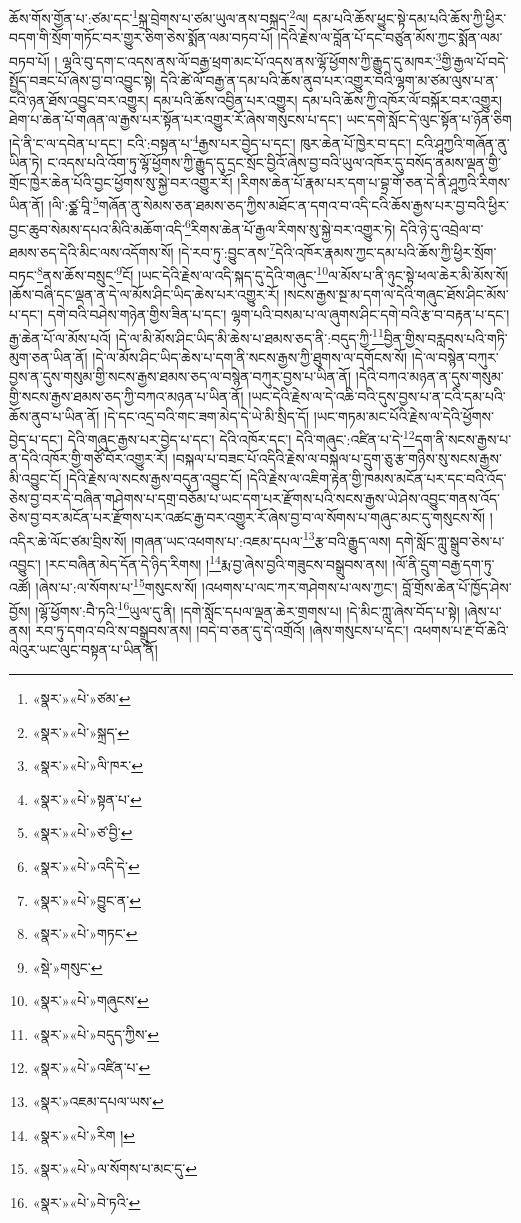 ཆོས་གོས་གྱོན་པ་:ཙམ་དང་\footnote{«སྣར་»«པེ་»ཙམ་}སྐྲ་བྲེགས་པ་ཙམ་ཡུལ་ནས་བསྐྲད་\footnote{«སྣར་»«པེ་»སྐྲད་}ལ། དམ་པའི་ཆོས་ཕྱུང་སྟེ་དམ་པའི་ཆོས་ཀྱི་ཕྱིར་བདག་གི་སྲོག་གཏོང་བར་གྱུར་ཅིག་ཅེས་སྨོན་ལམ་བཏབ་པོ། །དེའི་རྗེས་ལ་བློན་པོ་དང་བཙུན་མོས་ཀྱང་སྨོན་ལམ་བཏབ་པོ། །
ལྷའི་བུ་དག་ང་འདས་ནས་ལོ་བརྒྱ་ཕྲག་མང་པོ་འདས་ནས་ལྷོ་ཕྱོགས་ཀྱི་རྒྱུད་དུ་མཁར་\footnote{«སྣར་»«པེ་»ལི་ཁར་}གྱི་རྒྱལ་པོ་བདེ་སྤྱོད་བཟང་པོ་ཞེས་བྱ་བ་འབྱུང་སྟེ། དེའི་ཚེ་ལོ་བརྒྱ་ན་དམ་པའི་ཆོས་ནུབ་པར་འགྱུར་བའི་ལྷག་མ་ཙམ་ལུས་པ་ན་ངའི་ཉན་ཐོས་འབྱུང་བར་འགྱུར། དམ་པའི་ཆོས་འབྱིན་པར་འགྱུར། དམ་པའི་ཆོས་ཀྱི་འཁོར་ལོ་བསྐོར་བར་འགྱུར། ཐེག་པ་ཆེན་པོ་གཞན་ལ་རྒྱས་པར་སྟོན་པར་འགྱུར་རོ་ཞེས་གསུངས་པ་དང་། ཡང་དགེ་སློང་དེ་ལུང་སྟོན་པ་ཉོན་ཅིག །དེ་ནི་ང་ལ་དབེན་པ་དང་། ངའི་:བསྟན་པ་\footnote{«སྣར་»«པེ་»སྟན་པ་}རྒྱས་པར་བྱེད་པ་དང་། ཁུར་ཆེན་པོ་ཁྱེར་བ་དང་། ངའི་ཤཱཀྱའི་གཞོན་ནུ་ཡིན་ཏེ། ང་འདས་པའི་འོག་ཏུ་ལྷོ་ཕྱོགས་ཀྱི་རྒྱུད་དུ་དྲང་སྲོང་བྱིའོ་ཞེས་བྱ་བའི་ཡུལ་འཁོར་དུ་བསོད་ནམས་ལྡན་གྱི་གྲོང་ཁྱེར་ཆེན་པོའི་བྱང་ཕྱོགས་སུ་སྐྱེ་བར་འགྱུར་རོ། །རིགས་ཆེན་པོ་རྣམ་པར་དག་པ་བྷྲ་གོ་ཅན་དེ་ནི་ཤཱཀྱའི་རིགས་ཡིན་ནོ། །ལི་:ཙྪ་བཱི་\footnote{«སྣར་»«པེ་»ཙ་བྱི་}གཞོན་ནུ་སེམས་ཅན་ཐམས་ཅད་ཀྱིས་མཐོང་ན་དགའ་བ་འདི་ངའི་ཆོས་རྒྱས་པར་བྱ་བའི་ཕྱིར་བྱང་ཆུབ་སེམས་དཔའ་མིའི་མཆོག་འདི་\footnote{«སྣར་»«པེ་»འདི་དེ་}རིགས་ཆེན་པོ་རྒྱལ་རིགས་སུ་སྐྱེ་བར་འགྱུར་ཏེ། དེའི་ཉེ་དུ་འབྲེལ་བ་ཐམས་ཅད་དེའི་མིང་ལས་འདོགས་སོ། །དེ་རབ་ཏུ་:བྱུང་ནས་\footnote{«སྣར་»«པེ་»བྱུང་ན་}དེའི་འཁོར་རྣམས་ཀྱང་དམ་པའི་ཆོས་ཀྱི་ཕྱིར་སྲོག་བཏང་\footnote{«སྣར་»«པེ་»གཏང་}ནས་ཆོས་བསྲུང་\footnote{«སྡེ་»གསུང་}ངོ། །ཡང་དེའི་རྗེས་ལ་འདི་སྐད་དུ་དེའི་གཞུང་\footnote{«སྣར་»«པེ་»གཞུངས་}ལ་མོས་པ་ནི་ཉུང་སྟེ་ཕལ་ཆེར་མི་མོས་སོ། །ཆོས་བཞི་དང་ལྡན་ན་དེ་ལ་མོས་ཤིང་ཡིད་ཆེས་པར་འགྱུར་རོ། །སངས་རྒྱས་སྔ་མ་དག་ལ་དེའི་གཞུང་ཐོས་ཤིང་མོས་པ་དང་། དགེ་བའི་བཤེས་གཉེན་གྱིས་ཟིན་པ་དང་། ལྷག་པའི་བསམ་པ་ལ་ཞུགས་ཤིང་དགེ་བའི་རྩ་བ་བརྟན་པ་དང་། རྒྱ་ཆེན་པོ་ལ་མོས་པའོ། །དེ་ལ་མི་མོས་ཤིང་ཡིད་མི་ཆེས་པ་ཐམས་ཅད་ནི་:བདུད་ཀྱི་\footnote{«སྣར་»«པེ་»བདུད་ཀྱིས་}བྱིན་གྱིས་བརླབས་པའི་གཏི་མུག་ཅན་ཡིན་ནོ། །དེ་ལ་མོས་ཤིང་ཡིད་ཆེས་པ་དག་ནི་སངས་རྒྱས་ཀྱི་ཐུགས་ལ་དགོངས་སོ། །དེ་ལ་བསྙེན་བཀུར་བྱས་ན་དུས་གསུམ་གྱི་སངས་རྒྱས་ཐམས་ཅད་ལ་བསྙེན་བཀུར་བྱས་པ་ཡིན་ནོ། །དེའི་བཀའ་མཉན་ན་དུས་གསུམ་གྱི་སངས་རྒྱས་ཐམས་ཅད་ཀྱི་བཀའ་མཉན་པ་ཡིན་ནོ། །ཡང་དེའི་རྗེས་ལ་དེ་འཆི་བའི་དུས་བྱས་པ་ན་ངའི་དམ་པའི་ཆོས་ནུབ་པ་ཡིན་ནོ། །དེ་དང་འདྲ་བའི་གང་ཟག་མེད་དེ་ཡེ་མི་སྲིད་དོ། །ཡང་གཏམ་མང་པོའི་རྗེས་ལ་དེའི་ཕྱོགས་བྱེད་པ་དང་། དེའི་གཞུང་རྒྱས་པར་བྱེད་པ་དང་། དེའི་འཁོར་དང་། དེའི་གཞུང་:འཛིན་པ་དེ་\footnote{«སྣར་»«པེ་»འཛིན་པ་}དག་ནི་སངས་རྒྱས་པ་ན་དེའི་འཁོར་གྱི་གཙོ་བོར་འགྱུར་རོ། །བསྐལ་པ་བཟང་པོ་འདིའི་རྗེས་ལ་བསྐལ་པ་དྲུག་ཅུ་རྩ་གཉིས་སུ་སངས་རྒྱས་མི་འབྱུང་ངོ། །དེའི་རྗེས་ལ་སངས་རྒྱས་བདུན་འབྱུང་ངོ། །དེའི་རྗེས་ལ་འཇིག་རྟེན་གྱི་ཁམས་མངོན་པར་དང་བའི་འོད་ཅེས་བྱ་བར་དེ་བཞིན་གཤེགས་པ་དགྲ་བཅོམ་པ་ཡང་དག་པར་རྫོགས་པའི་སངས་རྒྱས་ཡེ་ཤེས་འབྱུང་གནས་འོད་ཅེས་བྱ་བར་མངོན་པར་རྫོགས་པར་འཚང་རྒྱ་བར་འགྱུར་རོ་ཞེས་བྱ་བ་ལ་སོགས་པ་གཞུང་མང་དུ་གསུངས་སོ། །འདིར་ཆེ་ལོང་ཙམ་བྲིས་སོ། །གཞན་ཡང་འཕགས་པ་:འཇམ་དཔལ་\footnote{«སྣར་»འཇམ་དཔལ་ཡས་}རྩ་བའི་རྒྱུད་ལས། དགེ་སློང་ཀླུ་སྒྲུབ་ཅེས་པ་འབྱུང་། །རང་བཞིན་མེད་དོན་དེ་ཉིད་རིགས། །\footnote{«སྣར་»«པེ་»རིག །}རྨ་བྱ་ཞེས་བྱའི་གཟུངས་བསྒྲུབས་ནས། །ལོ་ནི་དྲུག་བརྒྱ་དག་ཏུ་འཚོ། །ཞེས་པ་:ལ་སོགས་པ་\footnote{«སྣར་»«པེ་»ལ་སོགས་པ་མང་དུ་}གསུངས་སོ། །འཕགས་པ་ལང་ཀར་གཤེགས་པ་ལས་ཀྱང་། བློ་གྲོས་ཆེན་པོ་ཁྱོད་ཤེས་བྱོས། །ལྷོ་ཕྱོགས་:བཻ་ཏའི་\footnote{«སྣར་»«པེ་»བེ་ཏའི་}ཡུལ་དུ་ནི། །དགེ་སློང་དཔལ་ལྡན་ཆེར་གྲགས་པ། །དེ་མིང་ཀླུ་ཞེས་བོད་པ་སྟེ། །ཞེས་པ་ནས། རབ་ཏུ་དགའ་བའི་ས་བསྒྲུབས་ནས། །བདེ་བ་ཅན་དུ་དེ་འགྲོའོ། །ཞེས་གསུངས་པ་དང་། འཕགས་པ་རྔ་བོ་ཆེའི་ལེའུར་ཡང་ལུང་བསྟན་པ་ཡིན་ནོ། 